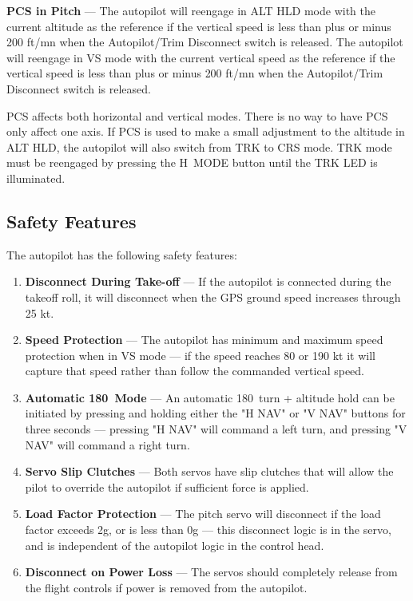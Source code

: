 \textbf{PCS in Pitch} --- The autopilot will reengage in ALT HLD mode with the current altitude as the reference if the vertical speed is less than plus or minus 200 ft/mn when the Autopilot/Trim Disconnect switch is released.  The autopilot will reengage in VS mode with the current vertical speed as the reference if the vertical speed is less than plus or minus 200 ft/mn when the Autopilot/Trim Disconnect switch is released.  

\begin{Note}
PCS affects both horizontal and vertical modes. There is no way to have PCS only affect one axis. If PCS is used to make a small adjustment to the altitude in ALT HLD, the autopilot will also switch from TRK to CRS mode. TRK mode must be reengaged by pressing the H~MODE button until the TRK LED is illuminated.
\end{Note}

\subsection*{Safety Features}
The autopilot has the following safety features:

\begin{enumerate}
\item \textbf{Disconnect During Take-off} --- If the autopilot is connected during the takeoff roll, it will disconnect when the GPS ground speed increases through 25 kt. 
\item \textbf{Speed Protection} --- The autopilot has minimum and maximum speed protection when in VS mode --- if the speed reaches 80 or 190 kt it will capture that speed rather than follow the commanded vertical speed. 
\item \textbf{Automatic 180\textdegree \ Mode} --- An automatic 180\textdegree \ turn + altitude hold can be initiated by pressing and holding either the "H NAV" or "V NAV" buttons for three seconds --- pressing "H NAV" will command a left turn, and pressing "V NAV" will command a right turn.
\item \textbf{Servo Slip Clutches} --- Both servos have slip clutches that will allow the pilot to override the autopilot if sufficient force is applied. 
\item \textbf{Load Factor Protection} --- The pitch servo will disconnect if the load factor exceeds 2g, or is less than 0g --- this disconnect logic is in the servo, and is independent of the autopilot logic in the control head. 
\item \textbf{Disconnect on Power Loss} --- The servos should completely release from the flight controls if power is removed from the autopilot.
\end{enumerate}

